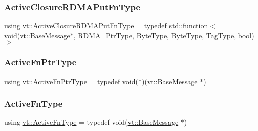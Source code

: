 \mbox{\label{namespacevt_ab526cbb2c45e18f3e7ba7d7727e5b0de}} 
\subsubsection{\texorpdfstring{Active\+Closure\+R\+D\+M\+A\+Put\+Fn\+Type}{ActiveClosureRDMAPutFnType}}
{\footnotesize\ttfamily using \hyperlink{namespacevt_ab526cbb2c45e18f3e7ba7d7727e5b0de}{vt\+::\+Active\+Closure\+R\+D\+M\+A\+Put\+Fn\+Type} = typedef std\+::function$<$ void(\hyperlink{namespacevt_ac34f95a5e2b8109b55bfba52b074443d}{vt\+::\+Base\+Message}$\ast$, \hyperlink{namespacevt_a9e2c953286c7616f7c218e9951790776}{R\+D\+M\+A\+\_\+\+Ptr\+Type}, \hyperlink{namespacevt_aab8d55968084610ce3b17057981e9300}{Byte\+Type}, \hyperlink{namespacevt_aab8d55968084610ce3b17057981e9300}{Byte\+Type}, \hyperlink{namespacevt_a84ab281dae04a52a4b243d6bf62d0e52}{Tag\+Type}, bool) $>$}

\mbox{\label{namespacevt_a70e19bd64d031e65083c2125b2c65426}} 
\subsubsection{\texorpdfstring{Active\+Fn\+Ptr\+Type}{ActiveFnPtrType}}
{\footnotesize\ttfamily using \hyperlink{namespacevt_a70e19bd64d031e65083c2125b2c65426}{vt\+::\+Active\+Fn\+Ptr\+Type} = typedef void($\ast$)(\hyperlink{namespacevt_ac34f95a5e2b8109b55bfba52b074443d}{vt\+::\+Base\+Message} $\ast$)}

\mbox{\label{namespacevt_a546925d221208866b866b2edf8f24d04}} 
\subsubsection{\texorpdfstring{Active\+Fn\+Type}{ActiveFnType}}
{\footnotesize\ttfamily using \hyperlink{namespacevt_a546925d221208866b866b2edf8f24d04}{vt\+::\+Active\+Fn\+Type} = typedef void(\hyperlink{namespacevt_ac34f95a5e2b8109b55bfba52b074443d}{vt\+::\+Base\+Message} $\ast$)}

